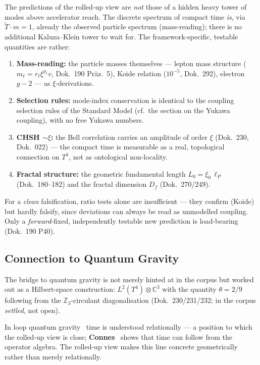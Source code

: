 \documentclass[11pt,a4paper]{article}
\begin{document}
The predictions of the rolled-up view are \emph{not} those of a hidden heavy tower of modes above accelerator reach. The discrete spectrum of compact time \emph{is}, via $\tilde{T}\cdot m = 1$, already the observed particle spectrum (mass-reading); there is no additional Kaluza--Klein tower to wait for. The framework-specific, testable quantities are rather:
\begin{enumerate}[leftmargin=1.6em,itemsep=0.2em]
 \item \textbf{Mass-reading:} the particle masses themselves --- lepton mass structure ($m_\ell=r_\ell\xi^{p_\ell}v$, Dok.~190 Präz.~5), Koide relation ($10^{-5}$, Dok.~292), electron $g-2$ --- as $\xi$-derivations.
 \item \textbf{Selection rules:} mode-index conservation is identical to the coupling selection rules of the Standard Model (cf.\ the section on the Yukawa coupling), with no free Yukawa numbers.
 \item \textbf{CHSH $\sim \xi$:} the Bell correlation carries an amplitude of order $\xi$ (Dok.~230, Dok.~022) --- the compact time is measurable as a real, topological connection on $T^4$, not as ontological non-locality.
 \item \textbf{Fractal structure:} the geometric fundamental length $L_0 = \xi_0\,\ell_P$ (Dok.~180--182) and the fractal dimension $D_f$ (Dok.~270/249).
\end{enumerate}

For a \emph{clean} falsification, ratio tests alone are insufficient --- they confirm (Koide) but hardly falsify, since deviations can always be read as unmodelled coupling. Only a \emph{forward}-fixed, independently testable new prediction is load-bearing (Dok.~190 P40).

\subsection{Connection to Quantum Gravity}

The bridge to quantum gravity is not merely hinted at in the corpus but worked out as a Hilbert-space construction: $L^2(T^4)\otimes\mathbb{C}^3$ with the quantity $\theta = 2/9$ following from the $\mathbb{Z}_3$-circulant diagonalisation (Dok.~230/231/232; in the corpus \emph{settled}, not open).

In loop quantum gravity~\cite{Rovelli2004,Thiemann2007} time is understood relationally --- a position to which the rolled-up view is close; \textbf{Connes}~\cite{Connes1994} shows that time can follow from the operator algebra. The rolled-up view makes this line concrete geometrically rather than merely relationally.
\end{document}
